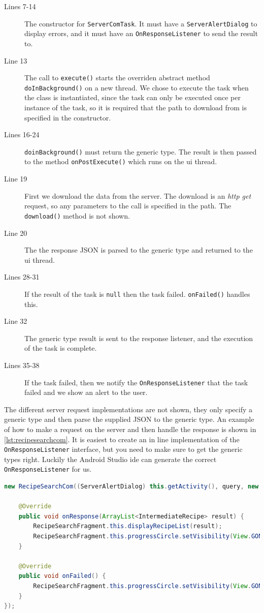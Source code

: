 \begin{description}
\item[Lines 7-14] The constructor for \lstinline|ServerComTask|. It must have a \lstinline|ServerAlertDialog| to display errors, and it must have an \lstinline|OnResponseListener| to send the result to.
\item[Line 13] The call to \lstinline|execute()| starts the overriden abstract method \lstinline|doInBackground()| on a new thread. We chose to execute the task when the class is instantiated, since the task can only be executed once per instance of the task, so it is required that the path to download from is specified in the constructor.
\item[Lines 16-24] \lstinline|doinBackground()| must return the generic type. The result is then passed to the method \lstinline|onPostExecute()| which runs on the \ac{ui} thread.
\item[Line 19] First we download the data from the server. The download is an \textit{http get} request, so any parameters to the call is specified in the path. The \lstinline|download()| method is not shown.
\item[Line 20] The the response JSON is parsed to the generic type and returned to the \ac{ui} thread.
\item[Lines 28-31] If the result of the task is \lstinline|null| then the task failed. \lstinline|onFailed()| handles this.
\item[Line 32] The generic type result is sent to the response listener, and the execution of the task is complete.
\item[Lines 35-38] If the task failed, then we notify the \lstinline|OnResponseListener| that the task failed and we show an alert to the user.
\end{description}
The different server request implementations are not shown, they only specify a generic type and then parse the supplied JSON to the generic type. An example of how to make a request on the server and then handle the response is shown in \autoref{lst:recipesearchcom}. It is easiest to create an in line implementation of the \lstinline|OnResponseListener| interface, but you need to make sure to get the generic types right. Luckily the Android Studio \ac{ide}  can generate the correct \lstinline|OnResponseListener| for us.

\begin{lstlisting}[language=java, label=lst:recipesearchcom, caption={Search for recipes by text}]
new RecipeSearchCom((ServerAlertDialog) this.getActivity(), query, new OnResponseListener<ArrayList<IntermediateRecipe>>() {
    
    @Override
    public void onResponse(ArrayList<IntermediateRecipe> result) {
        RecipeSearchFragment.this.displayRecipeList(result);
        RecipeSearchFragment.this.progressCircle.setVisibility(View.GONE);
    }

    @Override
    public void onFailed() {
        RecipeSearchFragment.this.progressCircle.setVisibility(View.GONE);
    }
});
\end{lstlisting}

